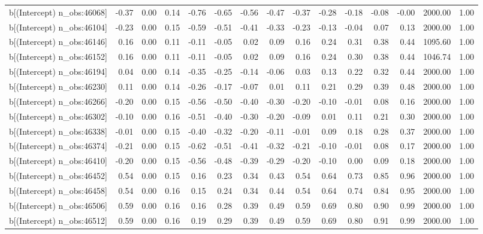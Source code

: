 \begin{table}[ht]
\begin{tabular}{rrrrrrrrrrrrrrr}
  b[(Intercept) n\_obs:46068] & -0.37 & 0.00 & 0.14 & -0.76 & -0.65 & -0.56 & -0.47 & -0.37 & -0.28 & -0.18 & -0.08 & -0.00 & 2000.00 & 1.00 \\ 
  b[(Intercept) n\_obs:46104] & -0.23 & 0.00 & 0.15 & -0.59 & -0.51 & -0.41 & -0.33 & -0.23 & -0.13 & -0.04 & 0.07 & 0.13 & 2000.00 & 1.00 \\ 
  b[(Intercept) n\_obs:46146] & 0.16 & 0.00 & 0.11 & -0.11 & -0.05 & 0.02 & 0.09 & 0.16 & 0.24 & 0.31 & 0.38 & 0.44 & 1095.60 & 1.00 \\ 
  b[(Intercept) n\_obs:46152] & 0.16 & 0.00 & 0.11 & -0.11 & -0.05 & 0.02 & 0.09 & 0.16 & 0.24 & 0.30 & 0.38 & 0.44 & 1046.74 & 1.00 \\ 
  b[(Intercept) n\_obs:46194] & 0.04 & 0.00 & 0.14 & -0.35 & -0.25 & -0.14 & -0.06 & 0.03 & 0.13 & 0.22 & 0.32 & 0.44 & 2000.00 & 1.00 \\ 
  b[(Intercept) n\_obs:46230] & 0.11 & 0.00 & 0.14 & -0.26 & -0.17 & -0.07 & 0.01 & 0.11 & 0.21 & 0.29 & 0.39 & 0.48 & 2000.00 & 1.00 \\ 
  b[(Intercept) n\_obs:46266] & -0.20 & 0.00 & 0.15 & -0.56 & -0.50 & -0.40 & -0.30 & -0.20 & -0.10 & -0.01 & 0.08 & 0.16 & 2000.00 & 1.00 \\ 
  b[(Intercept) n\_obs:46302] & -0.10 & 0.00 & 0.16 & -0.51 & -0.40 & -0.30 & -0.20 & -0.09 & 0.01 & 0.11 & 0.21 & 0.30 & 2000.00 & 1.00 \\ 
  b[(Intercept) n\_obs:46338] & -0.01 & 0.00 & 0.15 & -0.40 & -0.32 & -0.20 & -0.11 & -0.01 & 0.09 & 0.18 & 0.28 & 0.37 & 2000.00 & 1.00 \\ 
  b[(Intercept) n\_obs:46374] & -0.21 & 0.00 & 0.15 & -0.62 & -0.51 & -0.41 & -0.32 & -0.21 & -0.10 & -0.01 & 0.08 & 0.17 & 2000.00 & 1.00 \\ 
  b[(Intercept) n\_obs:46410] & -0.20 & 0.00 & 0.15 & -0.56 & -0.48 & -0.39 & -0.29 & -0.20 & -0.10 & 0.00 & 0.09 & 0.18 & 2000.00 & 1.00 \\ 
  b[(Intercept) n\_obs:46452] & 0.54 & 0.00 & 0.15 & 0.16 & 0.23 & 0.34 & 0.43 & 0.54 & 0.64 & 0.73 & 0.85 & 0.96 & 2000.00 & 1.00 \\ 
  b[(Intercept) n\_obs:46458] & 0.54 & 0.00 & 0.16 & 0.15 & 0.24 & 0.34 & 0.44 & 0.54 & 0.64 & 0.74 & 0.84 & 0.95 & 2000.00 & 1.00 \\ 
  b[(Intercept) n\_obs:46506] & 0.59 & 0.00 & 0.16 & 0.16 & 0.28 & 0.39 & 0.49 & 0.59 & 0.69 & 0.80 & 0.90 & 0.99 & 2000.00 & 1.00 \\ 
  b[(Intercept) n\_obs:46512] & 0.59 & 0.00 & 0.16 & 0.19 & 0.29 & 0.39 & 0.49 & 0.59 & 0.69 & 0.80 & 0.91 & 0.99 & 2000.00 & 1.00 \\ 

\end{tabular}
\end{table}
